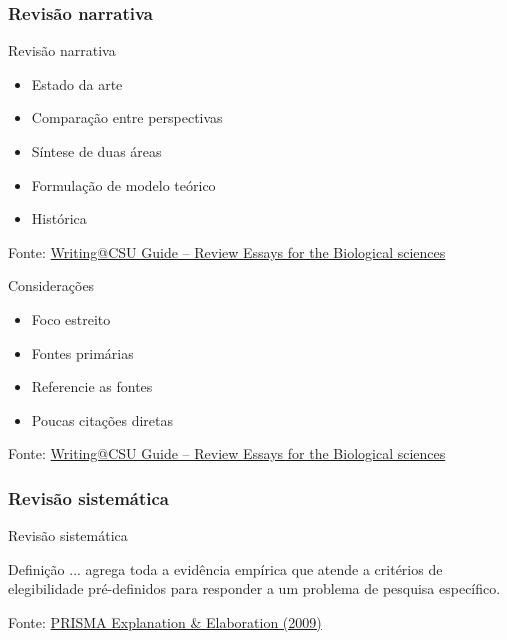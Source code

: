 \documentclass{beamer}
\begin{document}
\subsubsection[Narrativa]{Revisão narrativa}

\begin{frame}{Revisão narrativa}
  \begin{itemize}
    \scriptsize
  \item Estado da arte
    \bigskip
  \item Comparação entre perspectivas
    \bigskip
  \item Síntese de duas áreas
    \bigskip
  \item Formulação de modelo teórico
    \bigskip
  \item Histórica
  \end{itemize}

  \vfill
  \scriptsize
  \hfill Fonte: \href{https://writing.colostate.edu/guides/guide.cfm?guideid=79}
  {\tiny Writing@CSU Guide -- Review Essays for the Biological sciences}
\end{frame}

\begin{frame}{Considerações}
  \begin{itemize}
    \footnotesize
  \item Foco estreito
    \bigskip
  \item Fontes primárias
    \bigskip
  \item Referencie as fontes
    \bigskip
  \item Poucas citações diretas
  \end{itemize}

  \vfill
  \scriptsize
  \hfill Fonte: \href{https://writing.colostate.edu/guides/guide.cfm?guideid=79}
  {\tiny Writing@CSU Guide -- Review Essays for the Biological sciences}
\end{frame}

\subsubsection[Sistemática]{Revisão sistemática}

\begin{frame}{Revisão sistemática}
  \begin{block}{Definição}
    \footnotesize
    ... agrega toda a evidência empírica que atende a critérios de elegibilidade pré-definidos para responder a um problema de pesquisa específico.
  \end{block}

  \vfill
  \scriptsize
  \hfill Fonte: \href{https://doi.org/10.1371/journal.pmed.1000100}
  {\tiny PRISMA Explanation \& Elaboration (2009)}
\end{frame}
\end{document}
